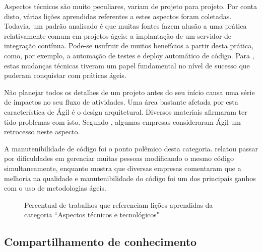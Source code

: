 Aspectos técnicos são muito peculiares, variam de projeto para projeto. Por conta disto, várias lições aprendidas referentes a estes aspectos foram coletadas. Todavia, um padrão analisado é que muitas fontes fazem alusão a uma prática relativamente comum em projetos ágeis: a implantação de um servidor de integração contínua. Pode-se usufruir de muitos benefícios a partir desta prática, como, por exemplo, a automação de testes e deploy automático de código. Para \cite{Block2011}, estas mudanças técnicas tiveram um papel fundamental no nível de sucesso que puderam conquistar com práticas ágeis.

Não planejar todos os detalhes de um projeto antes do seu início causa uma série de impactos no seu fluxo de atividades. Uma área bastante afetada por esta característica de Ágil é o design arquitetural. Diversos materiais afirmaram ter tido problemas com isto. Segundo \cite{Bustard2013}, algumas empresas consideraram Ágil um retrocesso neste aspecto.

A manutenibilidade de código foi o ponto polêmico desta categoria. \cite{Nokia2013} relatou passar por dificuldades em gerenciar muitas pessoas modificando o mesmo código simultaneamente, enquanto \cite{Bustard2013} mostra que diversas empresas comentaram que a melhoria na qualidade e manutenibilidade do código foi um dos principais ganhos com o uso de metodologias ágeis.

\begin{figure}[H]
	\centering
	\captionsetup{justification=centering}
	\caption{Percentual de trabalhos que referenciam lições aprendidas da categoria ``Aspectos técnicos e tecnológicos"}
	\label{fig:tech}
\end{figure}

\subsection{Compartilhamento de conhecimento}


